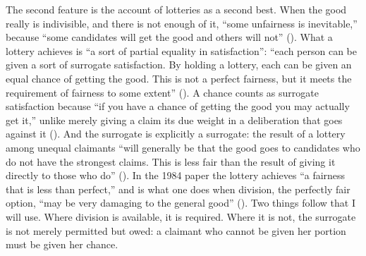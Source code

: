 \documentclass[
  11pt,
  letterpaper,
  DIV=11,
  numbers=noendperiod,
  twoside]{scrartcl}
\begin{document}
The second feature is the account of lotteries as a second best. When
the good really is indivisible, and there is not enough of it, ``some
unfairness is inevitable,'' because ``some candidates will get the good
and others will not'' ().
What a lottery achieves is ``a sort of partial equality in
satisfaction'': ``each person can be given a sort of surrogate
satisfaction. By holding a lottery, each can be given an equal chance of
getting the good. This is not a perfect fairness, but it meets the
requirement of fairness to some extent''
(). A chance counts as
surrogate satisfaction because ``if you have a chance of getting the
good you may actually get it,'' unlike merely giving a claim its due
weight in a deliberation that goes against it
(). And the surrogate is
explicitly a surrogate: the result of a lottery among unequal claimants
``will generally be that the good goes to candidates who do not have the
strongest claims. This is less fair than the result of giving it
directly to those who do'' (). In the 1984 paper the lottery achieves ``a fairness that is
less than perfect,'' and is what one does when division, the perfectly
fair option, ``may be very damaging to the general good''
(). Two things follow that I
will use. Where division is available, it is required. Where it is not,
the surrogate is not merely permitted but owed: a claimant who cannot be
given her portion must be given her chance.
\end{document}
